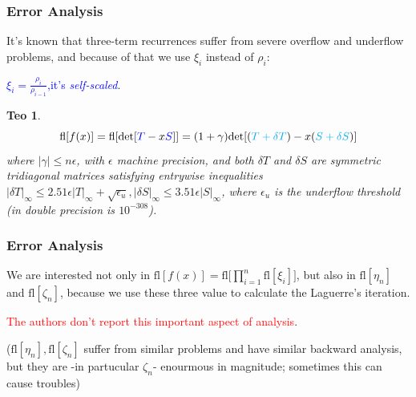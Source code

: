 \documentclass{beamer}
\theoremstyle{definition} \newtheorem{de}{Def}
\theoremstyle{remark} \newtheorem{os}[de]{Remark}
\theoremstyle{plain} \newtheorem{te}[de]{Teo}
\theoremstyle{plain} \newtheorem{co}[de]{Cor}
\theoremstyle{plain} \newtheorem{pr}[de]{Prop}
\theoremstyle{plain} \newtheorem{lem}[de]{Lemm}
\theoremstyle{remark} \newtheorem{rem}[de]{Remark}
\begin{document}
\begin{frame}
  \frametitle{Error Analysis}

It's known that three-term recurrences suffer from severe overflow and underflow problems, and because of that we use $\xi_i$ instead of $\rho_i$: 

\pause

\textcolor{blue}{$\xi_i=\frac{\rho_i}{\rho_{i-1}}$,it's \emph{self-scaled}}.

\pause

\begin{te}
  \begin{equation*}
    \text{fl}[f(x)] = \text{fl}[\text{det}[\textcolor{blue}{T}-x\textcolor{blue}{S}]] = (1 + \gamma)\text{det}[(\textcolor{cyan}{T+ \delta T}) -x(\textcolor{cyan}{S + \delta S})]
  \end{equation*}
  where $|\gamma|\le n\epsilon$, with $\epsilon$ machine precision, and both $\delta T$ and $\delta S$ are symmetric tridiagonal matrices satisfying entrywise inequalities $|\delta T|_{\infty}\le 2.51\epsilon |T|_{\infty} + \sqrt{\epsilon_u}, |\delta S|_{\infty}\le 3.51\epsilon |S|_{\infty}$, where $\epsilon_u$ is the underflow threshold (in double precision is $10^{-308}$).
\end{te}

\end{frame}

\begin{frame}
  \frametitle{Error Analysis}

We are interested not only in $\text{fl}[f(x)]=\text{fl}\Big[ \prod_{i=1}^n \text{fl}[\xi_i]  \Big]$, but also in $\text{fl}[\eta_n]$ and $\text{fl}[\zeta_n]$, because we use these three value to calculate the Laguerre's iteration.

\pause

\textcolor{red}{The authors don't report this important aspect of analysis}.

\pause

($\text{fl}[\eta_n],\text{fl}[\zeta_n]$ suffer from similar problems and have similar backward analysis, but they are -in partucular $\zeta_n$- enourmous in magnitude; sometimes this can cause troubles)

\end{frame}
\end{document}
